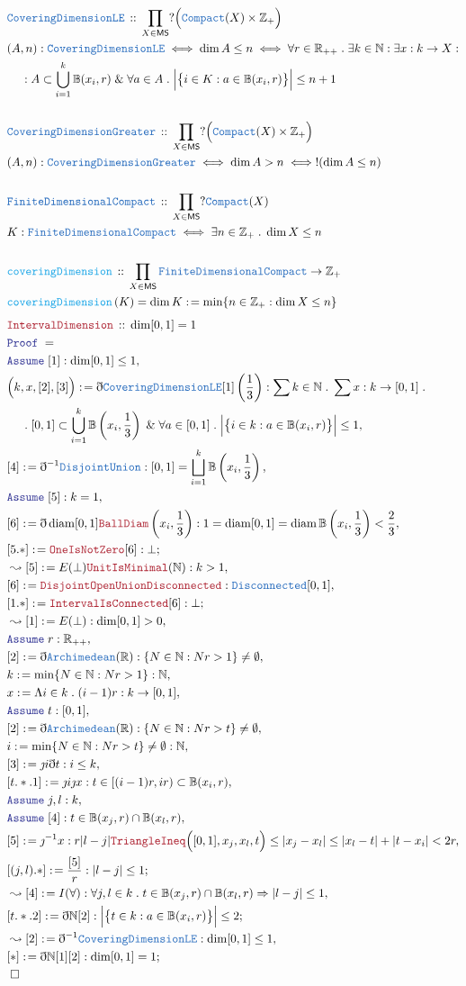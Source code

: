 \documentclass[12pt]{scrartcl}
\newcommand{\TYPE}[1]{\textcolor{NavyBlue}{\mathtt{#1}}}
\newcommand{\FUNC}[1]{\textcolor{Cerulean}{\mathtt{#1}}}
\newcommand{\LOGIC}[1]{\textcolor{Blue}{\mathtt{#1}}}
\newcommand{\THM}[1]{\textcolor{Maroon}{\mathtt{#1}}}
\renewcommand{\.}{\; . \;}
\newcommand{\de}{: \kern 0.1pc =}
\newcommand{\Act}[1]{\left( #1 \right)}
\newcommand{\Theorem}[2]{& \THM{#1} \, :: \, #2 \\ & \Proof = \\ }
\newcommand{\DeclareType}[2]{& \TYPE{#1} \, :: \, #2 \\}
\newcommand{\DefineType}[3]{& #1 : \TYPE{#2} \iff #3 \\}
\newcommand{\DefineNamedType}[4]{& #1 : \TYPE{#2} \iff #3 \iff #4 \\}
\newcommand{\DeclareFunc}[2]{& \FUNC{#1} \, :: \, #2 \\}
\newcommand{\DefineNamedFunc}[4]{&  \FUNC{#1}\Act{#2} = #3 \de #4 \\}
\newcommand{\NewLine}{\\ & \kern 1pc}
\newcommand{\Page}[1]{ \begin{align*} #1 \end{align*}   }
\newcommand{ \bd }{ \ByDef }
\renewcommand{\And}{\; \& \;}
\newcommand{\Imply}{\Rightarrow}
\newcommand{\Int}{\mathbb{Z} }
\newcommand{\Reals}{\mathbb{R} }
\newcommand{\Nat}{\mathbb{N} }
\newcommand{\Say}[3]{& #1 \de #2 : #3, \\}
\newcommand{\Conclude}[3]{& #1 \de #2 : #3; \\}
\newcommand{\Derive}[3]{& \leadsto #1 \de #2 : #3, \\}
\newcommand{\Assume}[2]{& \LOGIC{Assume} \; #1 : #2, \\}
\newcommand{\QED}{\; \square}
\newcommand{\EndProof}{& \QED \\}
\newcommand{\ByDef}{\eth}
\newcommand{\ByConstr}{\jmath}
\newcommand{\Proof}{\LOGIC{Proof} \; }
\DeclareMathOperator{\diam}{diam}
\newcommand{\MS}{\mathsf{MS}}
\begin{document}
\Page{
	\DeclareType{CoveringDimensionLE}{\prod_{X \in \MS} ?\Big(\TYPE{Compact}(X) \times \Int_{+} \Big)}
	\DefineNamedType{(A,n)}{CoveringDimensionLE}{\dim A \le  n }{
		\forall r \in \Reals_{++} \. 
		\exists k \in \Nat : \exists x : k \to X : \NewLine : 
		A \subset \bigcup^k_{i=1}  \mathbb{B}(x_i,r) \And  
		\forall a \in A  \. \Big|   \big\{ i \in K :  a \in \mathbb{B}(x_i,r)  \big\} \Big| \le n + 1                                                                                      
	}
	\\
	\DeclareType{CoveringDimensionGreater}{\prod_{X \in \MS} ?\Big(\TYPE{Compact}(X) \times \Int_+ \Big)}
	\DefineNamedType{(A,n)}{CoveringDimensionGreater}{\dim A >  n }{!(\dim A \le n)}
	\\
	\DeclareType{FiniteDimensionalCompact}{\prod_{X \in \MS} ?\TYPE{Compact}(X)}
	\DefineType{K}{FiniteDimensionalCompact}{\exists n \in \Int_+ \. \dim X \le n }
	\\
	\DeclareFunc{coveringDimension}{\prod_{X \in \MS} \TYPE{FiniteDimensionalCompact} \to \Int_+}
	\DefineNamedFunc{coveringDimension}{K}{\dim K}{\min \{ n \in \Int_{+} : \dim X \le n  \}}
}\Page{
	\Theorem{IntervalDimension}{ \dim [0,1] = 1}
	\Assume{[1]}{\dim [0,1] \le 1}
	\Say{\Big(k,x,[2],[3]\Big)}{\bd \TYPE{CoveringDimensionLE}[1]\Act{\frac{1}{3}}}{
		\sum k \in \Nat \. 
		\sum x : k \to [0,1] \. \NewLine \.
		[0,1] \subset \bigcup^k_{i=1} \mathbb{B}\Act{x_i,\frac{1}{3}} \And
		\forall a \in [0,1] \.  \Big|   \big\{ i \in k :  a \in \mathbb{B}(x_i,r)  \big\} \Big| \le 1 
	}
	\Say{[4]}{\bd^{-1} \TYPE{DisjointUnion}}{[0,1] = \bigsqcup^k_{i=1}\mathbb{B}\Act{x_i,\frac{1}{3}} }
	\Assume{[5]}{k=1}
	\Say{[6]}{\bd \diam [0,1] \THM{BallDiam}\Act{x_i,\frac{1}{3}} }{1 = \diam [0,1] = \diam \mathbb{B}\Act{x_i,\frac{1}{3}} < \frac{2}{3} }
	\Conclude{[5.*]}{\THM{OneIsNotZero}[6]}{\bot}
	\Derive{[5]}{E(\bot) \THM{UnitIsMinimal}(\Nat)}{k > 1}
	\Say{[6]}{\THM{DisjointOpenUnionDisconnected}}{\TYPE{Disconnected}[0,1]}
	\Conclude{[1.*]}{\THM{IntervalIsConnected}[6]}{\bot}
	\Derive{[1]}{E(\bot)}{\dim [0,1] > 0}
	\Assume{r}{\Reals_{++}}
	\Say{[2]}{\bd \TYPE{Archimedean}(\Reals)}{  \{  N \in \Nat : Nr > 1 \} \neq \emptyset   }
	\Say{k}{\min  \{  N \in \Nat : Nr > 1 \}  }{  \Nat }
	\Say{x}{\Lambda i \in k \. (i-1)r }{k \to [0,1]}
	\Assume{t}{[0,1]}
	\Say{[2]}{\bd \TYPE{Archimedean}(\Reals)}{  \{  N \in \Nat : Nr > t \} \neq \emptyset   }
	\Say{i}{\min\{  N \in \Nat : Nr > t \} \neq \emptyset}{\Nat}
	\Say{[3]}{\ByConstr i \bd t}{i \le k}
	\Say{[t.*.1]}{  \ByConstr i \ByConstr x }{     t \in [ (i-1)r, ir) \subset \mathbb{B}(x_i,r) }
	\Assume{j,l}{k}
	\Assume{[4]}{t  \in \mathbb{B}(x_j,r) \cap \mathbb{B}(x_l,r)}
	\Say{[5]}{\ByConstr^{-1} x}{  r|l - j| \THM{TriangleIneq}\Big([0,1],x_j,x_l,t\Big) \le | x_j - x_l| \le  | x_l - t| + |t - x_i| < 2r  }
	\Conclude{[(j,l).*]}{\frac{[5]}{r}}{|l-j| \le 1}
	\Derive{[4]}{I(\forall)}{\forall j,l \in k \.t  \in \mathbb{B}(x_j,r) \cap \mathbb{B}(x_l,r) \Imply |l-j| \le 1 }
	\Conclude{[t.*.2]}{\bd \Nat [2]}{\Big|   \big\{ t \in k :  a \in \mathbb{B}(x_i,r)  \big\} \Big| \le 2}
	\Derive{[2]}{\bd^{-1} \TYPE{CoveringDimensionLE}}{\dim [0,1] \le 1}
	\Conclude{[*]}{\bd \Nat [1][2]}{\dim [0,1] = 1}
	\EndProof	
}
\newpage
\end{document}
